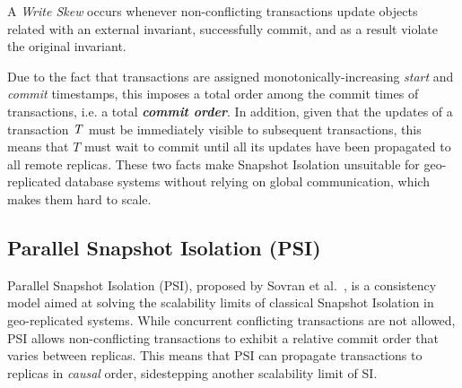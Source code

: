 


\begin{definition}
A \emph{Write Skew} occurs whenever non-conflicting transactions update objects related with an external invariant, successfully commit, and as a result violate the original invariant.
\end{definition}

Due to the fact that transactions are assigned monotonically-increasing \emph{start} and \emph{commit} timestamps, this imposes a total order among the commit times of transactions, i.e. a total \textbf{\em commit order}. In addition, given that the updates of a transaction $\mathit{T}$ must be immediately visible to subsequent transactions, this means that $T$ must wait to commit until all its updates have been propagated to all remote replicas. These two facts make Snapshot Isolation unsuitable for geo-replicated database systems without relying on global communication, which makes them hard to scale.

\subsection{Parallel Snapshot Isolation (PSI)}
\label{sect:psi}

Parallel Snapshot Isolation (PSI), proposed by Sovran et al.~\citep{psi-intro}, is a consistency model aimed at solving the scalability limits of classical Snapshot Isolation in geo-replicated systems. While concurrent conflicting transactions are not allowed, PSI allows non-conflicting transactions to exhibit a relative commit order that varies between replicas. This means that PSI can propagate transactions to replicas in \emph{causal} order, sidestepping another scalability limit of SI.

